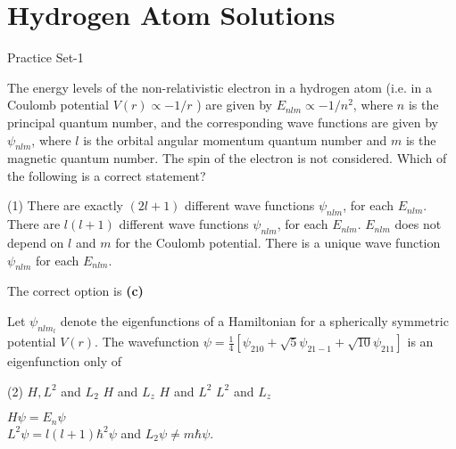\chapter{Hydrogen Atom Solutions}
\begin{abox}
	Practice Set-1 
	\end{abox}
\begin{enumerate}
\begin{minipage}{\textwidth}
	\item The energy levels of the non-relativistic electron in a hydrogen atom (i.e. in a Coulomb potential $V(r) \propto-1 / r$ ) are given by $E_{n l m} \propto-1 / n^{2}$, where $n$ is the principal quantum number, and the corresponding wave functions are given by $\psi_{n l m}$, where $l$ is the orbital angular momentum quantum number and $m$ is the magnetic quantum number. The spin of the electron is not considered. Which of the following is a correct statement?
\end{minipage}
\begin{tasks}(1)
	\task[\textbf{A.}] There are exactly $(2 l+1)$ different wave functions $\psi_{n l m}$, for each $E_{n l m}$.
	\task[\textbf{B.}]There are $l(l+1)$ different wave functions $\psi_{n l m}$, for each $E_{n l m}$.
	\task[\textbf{C.}] $E_{n l m}$ does not depend on $l$ and $m$ for the Coulomb potential.
	\task[\textbf{D.}]There is a unique wave function $\psi_{n l m}$ for each $E_{n l m}$.
\end{tasks}
\begin{answer}
	The correct option is \textbf{(c)}
\end{answer}
\begin{minipage}{\textwidth}
	\item Let $\psi_{n l m_{l}}$ denote the eigenfunctions of a Hamiltonian for a spherically symmetric potential $V(r)$. The wavefunction $\psi=\frac{1}{4}\left[\psi_{210}+\sqrt{5} \psi_{21-1}+\sqrt{10} \psi_{211}\right]$ is an eigenfunction only of
\end{minipage}
\begin{tasks}(2)
	\task[\textbf{A.}] $H, L^{2}$ and $L_{2}$
	\task[\textbf{B.}]$H$ and $L_{z}$
	\task[\textbf{C.}]$H$ and $L^{2}$
	\task[\textbf{D.}]$L^{2}$ and $L_{z}$
\end{tasks}
\begin{answer}
	$H \psi=E_{n} \psi$\\
	$L^{2} \psi=l(l+1) \hbar^{2} \psi$ and $L_{2} \psi \neq m \hbar \psi$.\\

\end{answer}
\end{enumerate}
